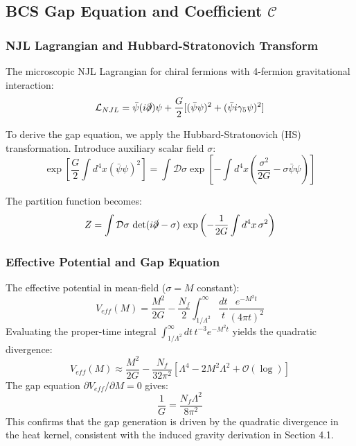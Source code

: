 \documentclass[a4paper,12pt]{article}
\begin{document}
\subsection{BCS Gap Equation and Coefficient $\mathcal{C}$}

\subsubsection{NJL Lagrangian and Hubbard-Stratonovich Transform}
The microscopic NJL Lagrangian for chiral fermions with 4-fermion gravitational interaction:
\begin{equation}
\mathcal{L}_{NJL} = \bar{\psi}(i\slashed{\partial})\psi + \frac{G}{2}[(\bar{\psi}\psi)^2 + (\bar{\psi}i\gamma_5\psi)^2]
\end{equation}

To derive the gap equation, we apply the Hubbard-Stratonovich (HS) transformation. Introduce auxiliary scalar field $\sigma$:
\begin{equation}
\exp\left[\frac{G}{2}\int d^4x (\bar{\psi}\psi)^2\right] = \int \mathcal{D}\sigma \exp\left[-\int d^4x \left(\frac{\sigma^2}{2G} - \sigma\bar{\psi}\psi\right)\right]
\end{equation}

The partition function becomes:
\begin{equation}
Z = \int \mathcal{D}\sigma \, \det(i\slashed{\partial} - \sigma) \, \exp\left(-\frac{1}{2G}\int d^4x\, \sigma^2\right)
\end{equation}

\subsubsection{Effective Potential and Gap Equation}
The effective potential in mean-field ($\sigma = M$ constant):
\begin{equation}
V_{eff}(M) = \frac{M^2}{2G} - \frac{N_f}{2} \int_{1/\Lambda^2}^\infty \frac{dt}{t} \frac{e^{-M^2 t}}{(4\pi t)^2}
\end{equation}
Evaluating the proper-time integral $\int_{1/\Lambda^2}^\infty dt \, t^{-3} e^{-M^2 t}$ yields the quadratic divergence:
\begin{equation}
V_{eff}(M) \approx \frac{M^2}{2G} - \frac{N_f}{32\pi^2}\left[ \Lambda^4 - 2M^2\Lambda^2 + \mathcal{O}(\log) \right]
\end{equation}
The gap equation $\partial V_{eff}/\partial M = 0$ gives:
\begin{equation}
\frac{1}{G} = \frac{N_f \Lambda^2}{8\pi^2}
\end{equation}
This confirms that the gap generation is driven by the quadratic divergence in the heat kernel, consistent with the induced gravity derivation in Section 4.1.
\end{document}
